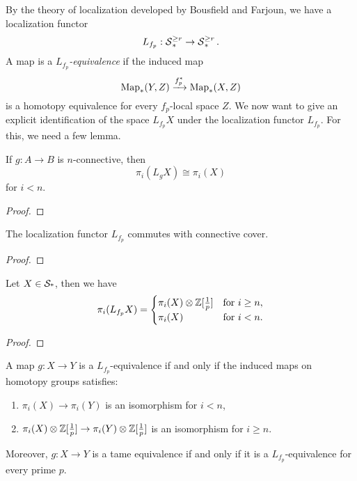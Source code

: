 By the theory of localization developed by Bousfield and Farjoun, we have a localization functor
\[
L_{f_p}:\operatorname{\mathcal{S}}^{\geq r}_{*} \to \operatorname{\mathcal{S}}^{\geq r}_{*}.
\]
A map is a \emph{$L_{f_p}$-equivalence} if the induced map
\[
	\operatorname{Map}_*(Y,Z) \xrightarrow{f_{p}^*} \operatorname{Map}_*(X,Z)
\]
is a homotopy equivalence for every $f_p$-local space $Z$. We now want to give an explicit identification of the space $L_{f_p}X$ under the localization functor $L_{f_p}$. For this, we need a few lemma.

\begin{lemma}
	If $g:A\to B$ is $n$-connective, then
	\[
	\pi_{i}(L_gX) \cong \pi_i(X)
	\]
	for $i< n$.
\end{lemma}
\begin{proof}
	
	
	
\end{proof}

\begin{lemma}
	The localization functor $L_{f_p}$ commutes with connective cover.
\end{lemma}
\begin{proof}
	
	
	
\end{proof}

\begin{proposition}
	Let $X\in \operatorname{\mathcal{S}_{*}}$, then we have 
	\[
	\pi_{i}(L_{f_p}X)= \begin{cases}
		\pi_{i}(X) \otimes {\mathbb{Z}}[\frac{1}{p}] &\text{for $i\geq n$},\\
		\pi_{i}(X) &\text{for $i< n$.}
	\end{cases}
	\]
\end{proposition}
\begin{proof}
	
\end{proof}

\begin{corollary}
\label{Char of tame equivalence}
	A map $g:X \to Y$ is a $L_{f_p}$-equivalence if and only if the induced maps on homotopy groups satisfies:
	\begin{enumerate}
		\item  $\pi_i(X) \to \pi_i (Y)$ is an isomorphism for $i <n$,
		\item $\pi_i(X)\otimes {\mathbb{Z}}[\frac{1}{p}] \to \pi_i(Y)\otimes {\mathbb{Z}}[\frac{1}{p}]$ is an isomorphism for $i \geq n$.
	\end{enumerate}
	Moreover, $g:X\to Y$ is a tame equivalence if and only if it is a $L_{f_p}$-equivalence for every prime $p$.
\end{corollary}

